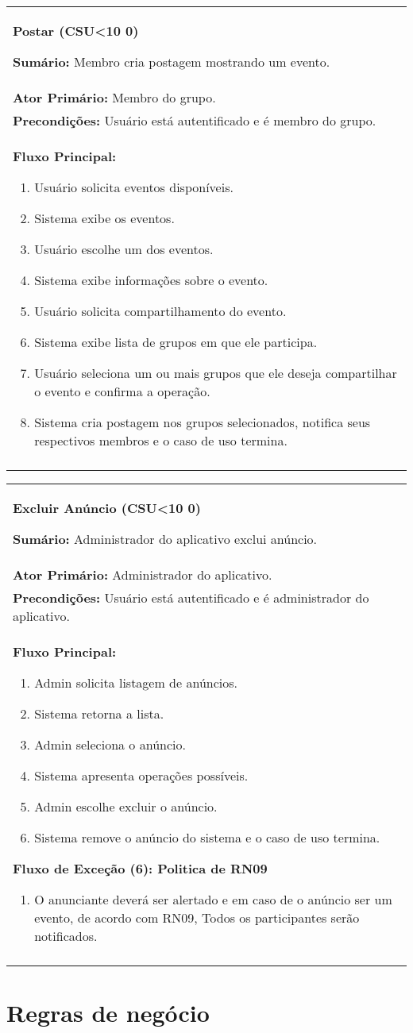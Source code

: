 \documentclass{article}
\newcounter{cscounter}
\newcommand{\sumario}[1] {\textbf{Sumário:} #1\\ }
\newcommand{\ator}[1] {\textbf{Ator Primário:} #1\\}
\newcommand{\precond}[1] {\textbf{Precondições:} #1\\}
\newcommand{\fluxo}{\textbf{Fluxo Principal:}}
\newenvironment{fluxoe}[2]
	{
		\textbf{Fluxo de Exceção (#1): #2}
		\begin{enumerate}[itemsep=0mm, label=(\alph*)]			
	}
	{
		\end{enumerate}			
	}
\newenvironment{casosdeuso}[1]
{
 \stepcounter{cscounter}
 \begin{center}
 \begin{tabular}{|p{\textwidth}|}
 \hline
 \begin{center}
 \large \textbf{#1 (CSU\ifnum\value{cscounter}<10 0\fi\arabic{cscounter})}
 \end{center}
}
{ 
 \\\\\hline
 \end{tabular} 
 \end{center}
}
\begin{document}
\begin{casosdeuso}{Postar}
 \sumario{Membro cria postagem mostrando um evento.}
 \ator{Membro do grupo.}
 \precond{Usuário está autentificado e é membro do grupo.}
\fluxo
\begin{enumerate}[itemsep=0mm]
 \item Usuário solicita eventos disponíveis.
 \item Sistema exibe os eventos.
 \item Usuário escolhe um dos eventos.
 \item Sistema exibe informações sobre o evento.
 \item Usuário solicita compartilhamento do evento.
 \item Sistema exibe lista de grupos em que ele participa.
 \item Usuário seleciona um ou mais grupos que ele deseja compartilhar o evento e confirma a operação.
 \item Sistema cria postagem nos grupos selecionados, notifica seus respectivos membros e o caso de uso termina.
\end{enumerate}
\end{casosdeuso}



\begin{casosdeuso}{Excluir Anúncio}
 \sumario{Administrador do aplicativo exclui anúncio.}
 \ator{Administrador do aplicativo.}
 \precond{Usuário está autentificado e é administrador do aplicativo.}
\fluxo
\begin{enumerate}[itemsep=0mm]
 \item Admin solicita listagem de anúncios.
 \item Sistema retorna a lista.
 \item Admin seleciona o anúncio.
 \item Sistema apresenta operações possíveis.
 \item Admin escolhe excluir o anúncio.
 \item Sistema remove o anúncio do sistema e o caso de uso termina.
\end{enumerate}
\begin{fluxoe}{6}{Politica de RN09}
\item O anunciante deverá ser alertado e em caso de o anúncio ser um evento, de acordo com RN09, Todos os participantes serão notificados.
\end{fluxoe}
\end{casosdeuso}


\section{Regras de negócio} 
\end{document}

